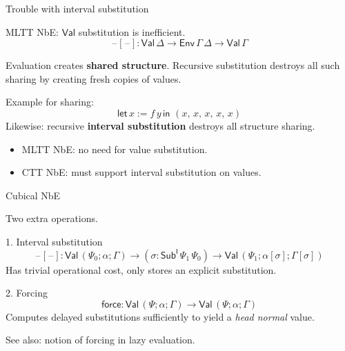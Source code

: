 \documentclass[dvipsnames]{beamer}
\newcommand{\ms}[1]{\mathsf{#1}}
\newcommand{\Sub}{\mathsf{Sub}}
\newcommand{\blank}{\mathord{\hspace{1pt}\text{--}\hspace{1pt}}}
\newcommand{\Env}{\ms{Env}}
\newcommand{\Val}{\ms{Val}}
\newcommand{\I}{\ms{I}}
\begin{document}
\begin{frame}{Trouble with interval substitution}

MLTT NbE: $\Val$ substitution is inefficient.
\[ \blank[\blank] : \Val\,\Delta \to \Env\,\Gamma\,\Delta \to \Val\,\Gamma \]

Evaluation creates \textbf{shared structure}. Recursive substitution
destroys all such sharing by creating fresh copies of values.
\vspace{1em}

Example for sharing:
\[ \ms{let}\,x := f\,y\,\ms{in}\,\,(x,\,x,\,x,\,x,\,x) \]
\pause
Likewise: recursive \textbf{interval substitution} destroys all structure sharing.
\begin{itemize}
\item MLTT NbE: no need for value substitution.
\item CTT NbE: \alert{must} support interval substitution on values.
\end{itemize}
\end{frame}

\begin{frame}{Cubical NbE}

Two extra operations.

\begin{block}{1. Interval substitution}
  \[ \blank[\blank] : \Val\,(\Psi_0;\alpha;\Gamma) \to (\sigma : \Sub^\I\,\Psi_1\,\Psi_0)
  \to \Val\,(\Psi_1;\alpha[\sigma];\Gamma[\sigma]) \]
Has \alert{trivial operational cost}, only stores an explicit substitution.
\pause
\end{block}

\begin{block}{2. Forcing}
\[ \ms{force} : \Val\,(\Psi;\alpha;\Gamma) \to \Val\,(\Psi;\alpha;\Gamma) \]
Computes delayed substitutions sufficiently to yield a \emph{head normal} value.

See also: notion of forcing in lazy evaluation.
\end{block}

\end{frame}
\end{document}
